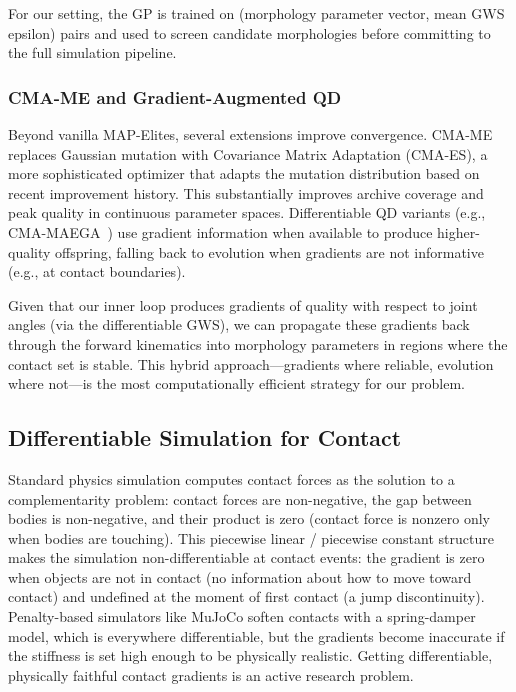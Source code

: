 \documentclass[journal]{IEEEtran}
\begin{document}
For our setting, the GP is trained on (morphology parameter vector, mean GWS epsilon) pairs
and used to screen candidate morphologies before committing to the full simulation pipeline.

\subsubsection{CMA-ME and Gradient-Augmented QD}

Beyond vanilla MAP-Elites, several extensions improve convergence.
CMA-ME~\cite{cmamae2022} replaces Gaussian mutation with Covariance Matrix Adaptation (CMA-ES),
a more sophisticated optimizer that adapts the mutation distribution based on recent
improvement history.
This substantially improves archive coverage and peak quality in continuous parameter spaces.
Differentiable QD variants (e.g., CMA-MAEGA~\cite{cmamae2022}) use gradient information
when available to produce higher-quality offspring, falling back to evolution when gradients
are not informative (e.g., at contact boundaries).

Given that our inner loop produces gradients of quality with respect to joint angles
(via the differentiable GWS), we can propagate these gradients back through the forward
kinematics into morphology parameters in regions where the contact set is stable.
This hybrid approach---gradients where reliable, evolution where not---is the most
computationally efficient strategy for our problem.

\subsection{Differentiable Simulation for Contact}
\label{sec:related_diffsim}

\begin{notebox}
Standard physics simulation computes contact forces as the solution to a complementarity
problem: contact forces are non-negative, the gap between bodies is non-negative, and their
product is zero (contact force is nonzero only when bodies are touching).
This piecewise linear / piecewise constant structure makes the simulation non-differentiable
at contact events: the gradient is zero when objects are not in contact (no information about
how to move toward contact) and undefined at the moment of first contact (a jump discontinuity).
Penalty-based simulators like MuJoCo soften contacts with a spring-damper model, which is
everywhere differentiable, but the gradients become inaccurate if the stiffness is set high
enough to be physically realistic.
Getting differentiable, physically faithful contact gradients is an active research problem.
\end{notebox}
\end{document}
